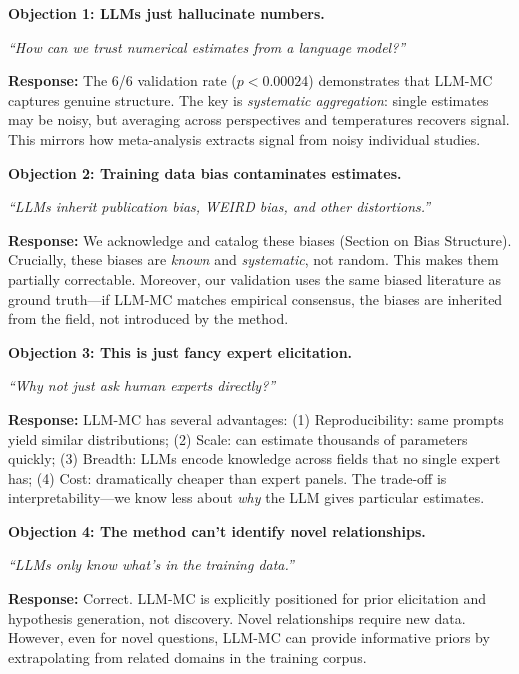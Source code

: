 \begin{tcolorbox}[colback=red!5!white, colframe=red!75!black,
    title=\textbf{Critical Foundations: Objections and Responses}]

\textbf{Objection 1: LLMs just hallucinate numbers.}

\textit{``How can we trust numerical estimates from a language model?''}

\textbf{Response:} The 6/6 validation rate ($p < 0.00024$) demonstrates that LLM-MC
captures genuine structure. The key is \textit{systematic aggregation}: single
estimates may be noisy, but averaging across perspectives and temperatures
recovers signal. This mirrors how meta-analysis extracts signal from noisy
individual studies.

\medskip

\textbf{Objection 2: Training data bias contaminates estimates.}

\textit{``LLMs inherit publication bias, WEIRD bias, and other distortions.''}

\textbf{Response:} We acknowledge and catalog these biases (Section on Bias Structure).
Crucially, these biases are \textit{known} and \textit{systematic}, not random.
This makes them partially correctable. Moreover, our validation uses the same
biased literature as ground truth---if LLM-MC matches empirical consensus,
the biases are inherited from the field, not introduced by the method.

\medskip

\textbf{Objection 3: This is just fancy expert elicitation.}

\textit{``Why not just ask human experts directly?''}

\textbf{Response:} LLM-MC has several advantages: (1) Reproducibility: same prompts
yield similar distributions; (2) Scale: can estimate thousands of parameters
quickly; (3) Breadth: LLMs encode knowledge across fields that no single expert
has; (4) Cost: dramatically cheaper than expert panels. The trade-off is
interpretability---we know less about \textit{why} the LLM gives particular estimates.

\medskip

\textbf{Objection 4: The method can't identify novel relationships.}

\textit{``LLMs only know what's in the training data.''}

\textbf{Response:} Correct. LLM-MC is explicitly positioned for prior elicitation
and hypothesis generation, not discovery. Novel relationships require new data.
However, even for novel questions, LLM-MC can provide informative priors by
extrapolating from related domains in the training corpus.

\end{tcolorbox}

